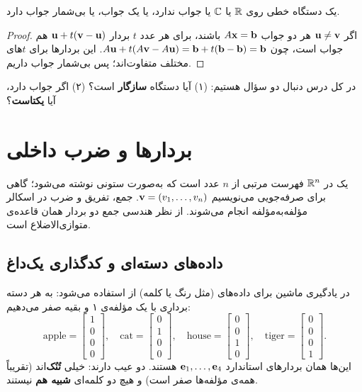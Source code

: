 \begin{theorem}\label{thm:num-solutions}
یک دستگاه خطی روی $\mathbb{R}$ یا $\mathbb{C}$ یا جواب ندارد، یا یک جواب، یا بی‌شمار جواب دارد.
\end{theorem}
\begin{proof}
اگر $\mathbf{u}\neq\mathbf{v}$ هر دو جواب $A\mathbf{x}=\mathbf{b}$ باشند، برای هر عدد $t$ بردار $\mathbf{u}+t(\mathbf{v}-\mathbf{u})$ هم جواب است، چون $A\mathbf{u}+t(A\mathbf{v}-A\mathbf{u})=\mathbf{b}+t(\mathbf{b}-\mathbf{b})=\mathbf{b}$. این بردارها برای $t$های مختلف متفاوت‌اند؛ پس بی‌شمار جواب داریم.
\end{proof}

در کل درس دنبال دو سؤال هستیم: (۱) آیا دستگاه \textbf{سازگار} است؟ (۲) اگر جواب دارد، آیا \textbf{یکتاست}؟

\section{بردارها و ضرب داخلی}

یک  در $\mathbb{R}^n$ فهرست مرتبی از $n$ عدد است که به‌صورت ستونی نوشته می‌شود؛ گاهی برای صرفه‌جویی می‌نویسیم $\mathbf{v}=(v_1,\dots,v_n)$. جمع، تفریق و ضرب در اسکالر مؤلفه‌به‌مؤلفه انجام می‌شوند. از نظر هندسی جمع دو بردار همان قاعده‌ی متوازی‌الاضلاع است.

\subsection{داده‌های دسته‌ای و کدگذاری یک‌داغ}
در یادگیری ماشین برای داده‌های  (مثل رنگ یا کلمه) از  استفاده می‌شود: به هر دسته برداری با یک مؤلفه‌ی ۱ و بقیه صفر می‌دهیم:
\[
\text{apple}=\begin{bmatrix}1\\0\\0\\0\end{bmatrix},\quad
\text{cat}=\begin{bmatrix}0\\1\\0\\0\end{bmatrix},\quad
\text{house}=\begin{bmatrix}0\\0\\1\\0\end{bmatrix},\quad
\text{tiger}=\begin{bmatrix}0\\0\\0\\1\end{bmatrix}.
\]
این‌ها همان بردارهای استاندارد $\mathbf{e}_1,\dots,\mathbf{e}_4$ هستند. دو عیب دارند: خیلی \textbf{تُنُک}‌اند (تقریباً همه‌ی مؤلفه‌ها صفر است) و هیچ دو کلمه‌ای \textbf{شبیه هم} نیستند.

